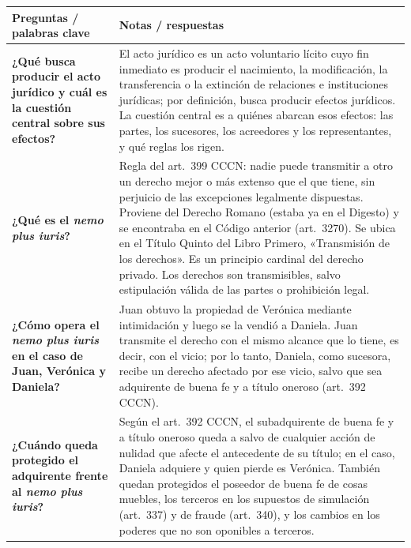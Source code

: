 \documentclass[12pt,oneside]{book}
\begin{document}
\begin{table}[H]
\centering
\small
\renewcommand{\arraystretch}{1.3}
\begin{tabularx}{\textwidth}{
    >{\raggedright\arraybackslash}p{}
    >{\raggedright\arraybackslash}X
}
\toprule
\textbf{Preguntas / palabras clave} &
\textbf{Notas / respuestas} \\
\midrule

\textbf{¿Qué busca producir el acto jurídico y cuál es la cuestión central sobre sus efectos?} &
El acto jurídico es un acto voluntario lícito cuyo fin inmediato es producir el nacimiento, la modificación, la transferencia o la extinción de relaciones e instituciones jurídicas; por definición, busca producir efectos jurídicos. La cuestión central es a quiénes abarcan esos efectos: las partes, los sucesores, los acreedores y los representantes, y qué reglas los rigen. \\

\midrule

\textbf{¿Qué es el \textit{nemo plus iuris}?} &
Regla del art.~399 CCCN: nadie puede transmitir a otro un derecho mejor o más extenso que el que tiene, sin perjuicio de las excepciones legalmente dispuestas. Proviene del Derecho Romano (estaba ya en el Digesto) y se encontraba en el Código anterior (art.~3270). Se ubica en el Título Quinto del Libro Primero, «Transmisión de los derechos». Es un principio cardinal del derecho privado. Los derechos son transmisibles, salvo estipulación válida de las partes o prohibición legal. \\

\midrule

\textbf{¿Cómo opera el \textit{nemo plus iuris} en el caso de Juan, Verónica y Daniela?} &
Juan obtuvo la propiedad de Verónica mediante intimidación y luego se la vendió a Daniela. Juan transmite el derecho con el mismo alcance que lo tiene, es decir, con el vicio; por lo tanto, Daniela, como sucesora, recibe un derecho afectado por ese vicio, salvo que sea adquirente de buena fe y a título oneroso (art.~392 CCCN). \\

\midrule

\textbf{¿Cuándo queda protegido el adquirente frente al \textit{nemo plus iuris}?} &
Según el art.~392 CCCN, el subadquirente de buena fe y a título oneroso queda a salvo de cualquier acción de nulidad que afecte el antecedente de su título; en el caso, Daniela adquiere y quien pierde es Verónica. También quedan protegidos el poseedor de buena fe de cosas muebles, los terceros en los supuestos de simulación (art.~337) y de fraude (art.~340), y los cambios en los poderes que no son oponibles a terceros. \\


\end{tabularx}
\end{table}
\end{document}
